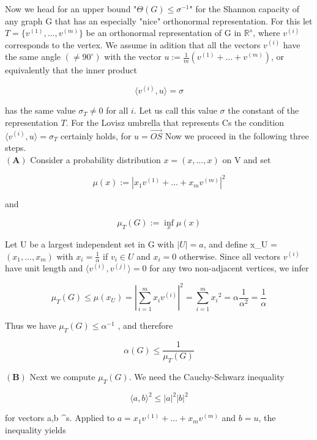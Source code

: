\documentclass[12pt]{memoir}
\newcommand{\setnewpagemargins}{
    \clearpage
    \checkandfixthelayout
}
\begin{document}

\setnewpagemargins

Now we head for an upper bound "$\Theta(G) \leq \sigma^{-1}$" for the Shannon capacity
of any graph G that has an especially "nice" orthonormal representation.
For this let $T = \{v^{(1)},\ldots,v^{(m)}\}$ be an orthonormal representation 
of G in $\mathbb{R}^{s}$, where $v^{(i)}$ corresponds to the vertex. We assume in
adition that all the vectors $v^{(i)}$ have the same angle $(\neq 90^{\circ})$ with the
vector $u := {\frac{1}{m}}(v^{(1)}+\ldots+v^{(m)})$, or equivalently that the inner product 

\[
 \langle v^{(i)}, u\rangle  = \sigma 
\]

 has the same value $\sigma_T \neq 0$ for all $i$. Let us call this value $\sigma$ the constant
of the representation $T$. For the Lovisz umbrella that represents Cs the 
condition $\langle v^{(i)},u \rangle = \sigma_T$ certainly holds, for $u = \overrightarrow{OS}$
Now we proceed in the following three steps.\\
$\mathbf{(A)}$ Consider a probability distribution $x = (x,\ldots, x)$ on V and set

\[
\mu(x) := |x_1v^{(1)}+\ldots+x_mv^{(m)}|^{2}
\]

and

\[
{\mu_{T}}(G) := \underset{x}{\inf}\mu(x)
\]

Let U be a largest independent set in G with $|U| = a$, and define x_U =\\
$(x_1,\ldots,x_m)$ with $x_i = {\frac{1}{\alpha}}$ if $v_i\in U$ and $x_i = 0$  otherwise. Since all 
vectors $v^{(i)}$  have unit length and $\langle v^{(i)}, v^{(j)} \rangle = 0$ for any two non-adjacent 
vertices, we infer

\[
    \mu_T(G)\leq\mu(x_U)=|\sum_{i=1}^{m}x_iv^{(i)}|^2= \sum_{i=1}^{m} {x_i}^2 = \alpha {\frac{1}{\alpha^{2}}} = {\frac{1}{\alpha}}
\]

Thus we have $\mu_{T}(G) \leq \alpha^{-1}$ , and therefore

\[
    \alpha(G) \leq {\frac{1}{\mu_{T}(G)}}
\]

$\mathbf{(B)}$ Next we compute ${\mu_T}(G)$. We need the Cauchy-Schwarz inequality

\[
\langle a,b \rangle^2 \leq |a|^2 |b|^2
\]

for vectors a,b \in {}^s. Applied to $a = x_{1}v^{(1)}+\ldots+x_{m}v^{(m)}$ and $b=u$,
the inequality yields
\end{document}
